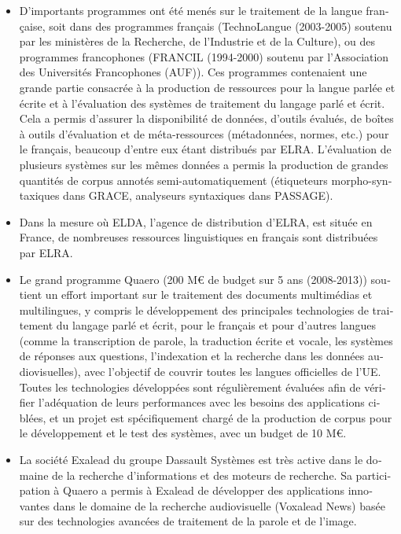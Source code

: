 \begin{french}
\begin{multicols}{2}
\begin{itemize}
\item D'importants programmes ont été menés sur le traitement
  de la langue française, soit dans des programmes français
  (TechnoLangue (2003-2005) soutenu par les ministères de la
  Recherche, de l'Industrie et de la Culture), ou des
  programmes francophones (FRANCIL (1994-2000) soutenu par l'Association des Universités Francophones (AUF)). Ces programmes
  contenaient une grande partie consacrée à la production de
  ressources pour la langue parlée et écrite et à l'évaluation
  des systèmes de traitement du langage parlé et écrit. Cela a permis
  d'assurer la disponibilité de données, d'outils
  évalués, de boîtes à outils d'évaluation et de
  méta-ressources (métadonnées, normes, etc.) pour le français,
  beaucoup d'entre eux étant distribués par ELRA. L'évaluation de plusieurs systèmes sur les mêmes données a permis
  la production de grandes quantités de corpus annotés
  semi-automatiquement (étiqueteurs morpho-syntaxiques dans GRACE,
  analyseurs syntaxiques dans PASSAGE).

\item Dans la mesure où ELDA, l'agence de distribution d'ELRA, est située en
France, de nombreuses ressources linguistiques en français sont
distribuées par ELRA.

\item Le grand programme Quaero (200 M€ de budget sur 5 ans (2008-2013))
soutient un effort important sur le traitement des documents
multimédias et multilingues, y compris le développement des
principales technologies de traitement du langage parlé et écrit, pour
le français et pour d'autres langues (comme la transcription de
parole, la traduction écrite et vocale, les systèmes de réponses aux
questions, l'indexation et la recherche dans les données
audiovisuelles), avec l'objectif de couvrir toutes les langues
officielles de l'UE. Toutes les technologies développées sont
régulièrement évaluées afin de vérifier l'adéquation de leurs
performances avec les besoins des applications ciblées, et un projet
est spécifiquement chargé de la production de corpus pour le
développement et le test des systèmes, avec un budget de 10 M€.

\item La société Exalead du groupe Dassault Systèmes est très active dans le
domaine de la recherche d'informations et des moteurs de recherche. Sa
participation à Quaero a permis à Exalead de développer des
applications innovantes dans le domaine de la recherche audiovisuelle
(Voxalead News) basée sur des technologies avancées de traitement de
la parole et de l'image.


\end{itemize}
\end{multicols}
\end{french}

